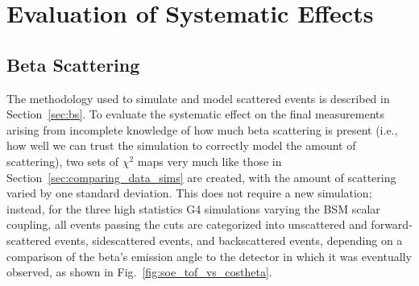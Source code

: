 


\FloatBarrier
\section{Evaluation of Systematic Effects}
\label{section:systematics}
\subsection{Beta Scattering}
\label{section:scattering_systematics}
The methodology used to simulate and model scattered events is described in Section~\ref{sec:bs}.  To evaluate the systematic effect on the final measurements arising from incomplete knowledge of how much beta scattering is present (i.e., how well we can trust the simulation to correctly model the amount of scattering), 
two sets of $\chi^2$ maps very much like those in Section~\ref{sec:comparing_data_sims} are created, with the amount of scattering varied by one standard deviation.  This does not require a new simulation;  instead, for the three high statistics G4 simulations varying the BSM scalar coupling, all events passing the cuts are categorized into unscattered and forward-scattered events, sidescattered events, and backscattered events, depending on a comparison of the beta's emission angle to the detector in which it was eventually observed, as shown in Fig.~\ref{fig:soe_tof_vs_costheta}.

